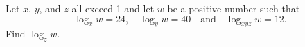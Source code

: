 Let $x$, $y$, and $z$ all exceed 1 and let $w$ be a positive number such that \[\log_x w = 24,\quad \log_y w = 40 \quad\text{and}\quad \log_{xyz} w = 12.\]Find $\log_z w$.